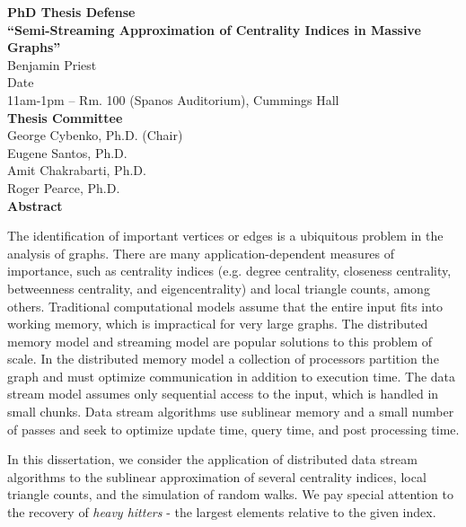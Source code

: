 \documentclass{report}
\begin{document}
\begin{center}
{\LARGE \textbf{PhD Thesis Defense}} \\
\vspace{1em}
\textbf{``Semi-Streaming Approximation of Centrality Indices in Massive Graphs''} \\
\vspace{1em}
Benjamin Priest \\
\vspace{1em}
Date \\
11am-1pm -- Rm. 100 (Spanos Auditorium), Cummings Hall \\
\vspace{1em}
\textbf{Thesis Committee} \\
George Cybenko, Ph.D. (Chair) \\
Eugene Santos, Ph.D. \\
Amit Chakrabarti, Ph.D. \\
Roger Pearce, Ph.D. \\
\vspace{2em}
{\LARGE \textbf{Abstract}} \\
\end{center}

The identification of important vertices or edges is a ubiquitous problem in the analysis of graphs.
There are many application-dependent measures of importance, such as centrality indices (e.g. degree centrality, closeness centrality, betweenness centrality, and eigencentrality) and local triangle counts, among others.
Traditional computational models assume that the entire input fits into working memory, which is impractical for very large graphs.
The distributed memory model and streaming model are popular solutions to this problem of scale.
In the distributed memory model a collection of processors partition the graph and must optimize communication in addition to execution time.
The data stream model assumes only sequential access to the input, which is handled in small chunks.
Data stream algorithms use sublinear memory and a small number of passes and seek to optimize update time, query time, and post processing time.  

In this dissertation, we consider the application of distributed data stream algorithms to the sublinear approximation of several centrality indices, local triangle counts, and the simulation of random walks. 
We pay special attention to the recovery of \emph{heavy hitters} - the largest elements relative to the given index.
\end{document}
